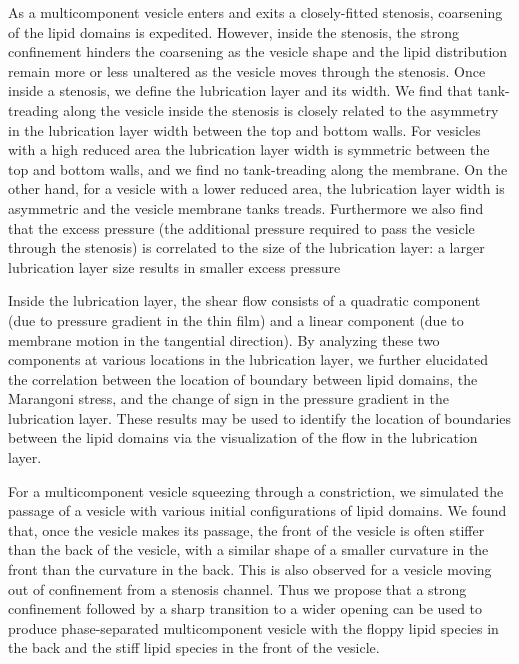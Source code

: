 \documentclass[twoside,twocolumn,9pt]{article}
\begin{document}
As a multicomponent vesicle enters and exits a closely-fitted stenosis,
coarsening of the lipid domains is expedited. However, inside the
stenosis, the strong confinement hinders the coarsening as the vesicle
shape and the lipid distribution remain more or less unaltered as the
vesicle moves through the stenosis. Once inside a stenosis, we define
the lubrication layer and its width. We find that tank-treading along
the vesicle inside the stenosis is closely related to the asymmetry in
the lubrication layer width between the top and bottom walls. For
vesicles with a high reduced area the lubrication layer width is
symmetric between the top and bottom walls, and we find no tank-treading
along the membrane. On the other hand, for a vesicle with a lower
reduced area, the lubrication layer width is asymmetric and the vesicle
membrane tanks treads. Furthermore we also find that the excess pressure
(the additional pressure required to pass the vesicle through the
stenosis) is correlated to the size of the lubrication layer: a larger
lubrication layer size results in smaller excess pressure

Inside the lubrication layer, the shear flow consists of a quadratic
component (due to pressure gradient in the thin film) and a linear
component (due to membrane motion in the tangential direction). By
analyzing these two components at various locations in the lubrication
layer, we further elucidated the correlation between the location of
boundary between lipid domains, the Marangoni stress, and the change of
sign in the pressure gradient in the lubrication layer. These results
may be used to identify the location of boundaries between the lipid
domains via the visualization of the flow in the lubrication layer.

For a multicomponent vesicle squeezing through a constriction, we
simulated the passage of a vesicle with various initial configurations
of lipid domains. We found that, once the vesicle makes its passage, the
front of the vesicle is often stiffer than the back of the vesicle, with
a similar shape of a smaller curvature in the front than the curvature
in the back. This is also observed for a vesicle moving out of
confinement from a stenosis channel. Thus we propose that a strong
confinement followed by a sharp transition to a wider opening can be
used to produce phase-separated multicomponent vesicle with the floppy
lipid species in the back and the stiff lipid species in the front of
the vesicle.
\end{document}
